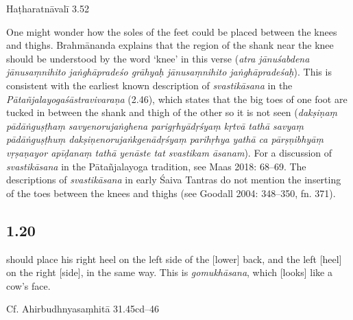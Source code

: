\begin{ekdosis}
\begin{testimonia}[hp01_019]
Haṭharatnāvalī 3.52

\begin{versinnote}
\end{versinnote}

\end{testimonia}

\begin{philcomm}[hp01_019]        
One might wonder how the soles of the feet could be placed between the knees and thighs. Brahmānanda explains that the region of the shank near the knee should be understood by the word ‘knee’ in this verse (\emph{atra jānuśabdena jānusaṃnihito jaṅghāpradeśo grāhyaḥ jānusaṃnihito jaṅghāpradeśaḥ}). This is consistent with the earliest known description of \emph{svastikāsana} in the \emph{Pātañjalayogaśāstravivaraṇa} (2.46), which states that the big toes of one foot are tucked in between the shank and thigh of the other so it is not seen (\emph{dakṣiṇaṃ pādāṅguṣṭhaṃ savyenorujaṅghena parigṛhyādṛśyaṃ kṛtvā tathā savyaṃ pādāṅguṣṭhuṃ dakṣiṇenorujaṅkgenādṛśyaṃ parihṛhya yathā ca pārṣṇibhyāṃ vṛṣaṇayor apīḍanaṃ tathā yenāste tat svastikam āsanam}). For a discussion of \emph{svastikāsana} in the Pātañjalayoga tradition, see Maas 2018: 68–69. The descriptions of \emph{svastikāsana} in early Śaiva Tantras do not mention the inserting of the toes between the knees and thighs (see Goodall 2004: 348–350, fn. 371).
\end{philcomm}

\subsection*{1.20}
\begin{translation} should place his right heel on the left side of the [lower] back, and the left [heel] on the right [side], in the same way. This is \emph{gomukhāsana}, which [looks] like a cow's face.
\end{translation}

\begin{sources}[hp01_020]
Cf. Ahirbudhnyasaṃhitā 31.45cd–46

\begin{versinnote}
\end{versinnote}


\end{sources}
\end{ekdosis}
